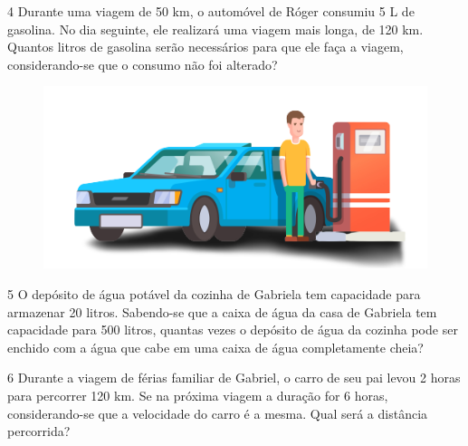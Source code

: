 
\num{4} Durante uma viagem de 50 km, o automóvel de Róger consumiu 5 L de
gasolina. No dia seguinte, ele realizará uma viagem mais longa, de 120 km.
Quantos litros de gasolina serão necessários para que ele faça a viagem,
considerando-se que o consumo não foi alterado?

\begin{figure}[htpb!]
\centering
\includegraphics[width=\textwidth]{media/image70a.png}
\end{figure}


\num{5} O depósito de água potável da cozinha de Gabriela tem capacidade para
armazenar 20 litros. Sabendo-se que a caixa de água da casa de Gabriela
tem capacidade para 500 litros, quantas vezes o depósito de água da
cozinha pode ser enchido com a água que cabe em uma caixa de água
completamente cheia?


\num{6} Durante a viagem de férias familiar de Gabriel, o carro de seu pai
levou 2 horas para percorrer 120 km. Se na próxima viagem a duração for 6
horas, considerando-se que a velocidade do carro é a mesma. Qual será a distância 
percorrida? 

